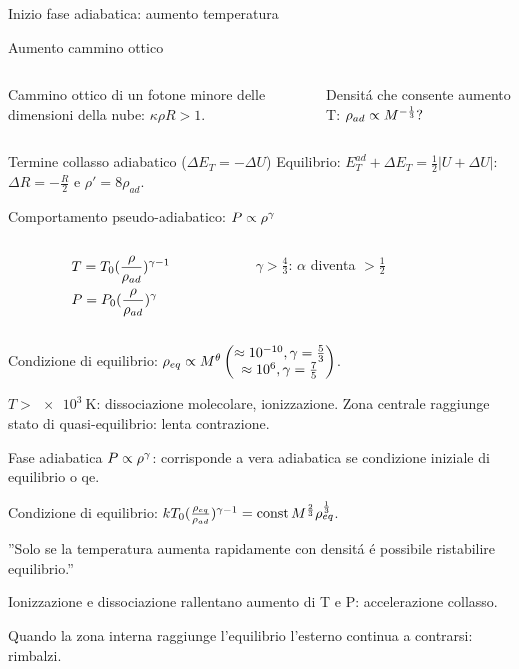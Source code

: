 \begin{frame}{Inizio fase adiabatica: aumento temperatura}
\begin{block}{Aumento cammino ottico}
\begin{columns}[T]
\begin{column}{0.5\textwidth}
Cammino ottico di un fotone minore delle dimensioni della nube: $\kappa\rho R>1$.
\end{column}
\begin{column}{0.5\textwidth}
Densit\'a che consente aumento T: $\rho_{ad}\propto M^{-\frac{1}{3}}?$
\end{column}
\end{columns}
\end{block}
\begin{block}{Termine collasso adiabatico ($\Delta E_T=-\Delta U$)}
Equilibrio: $E_T^{ad}+\Delta E_T=\frac{1}{2}|U+\Delta U|$: $\Delta R=-\frac{R}{2}$ e $\rho'=8\rho_{ad}$.
\end{block}
\begin{block}{Comportamento pseudo-adiabatico: $P\propto\rho^{\gamma}$}
\begin{columns}[T]
\begin{column}{0.5\textwidth}
\begin{align*}
&T=T_0(\frac{\rho}{\rho_{ad}})^{\gamma-1}\\
&P=P_0(\frac{\rho}{\rho_{ad}})^{\gamma}
\end{align*}
\end{column}
\begin{column}{0.5\textwidth}
$\gamma>\frac{4}{3}$: $\alpha$ diventa $>\frac{1}{2}$
\end{column}
\end{columns}
Condizione di equilibrio: $\rho_{eq}\propto M^{\theta}\begin{pmatrix}
\approx\num{e-10}, \gamma=\frac{5}{3}\\
\approx\num{e6}, \gamma=\frac{7}{5}
\end{pmatrix}$.
\end{block}
$T>\SI{e3}{\kelvin}$: dissociazione molecolare, ionizzazione.
Zona centrale raggiunge stato di quasi-equilibrio: lenta contrazione.
\end{frame}

\begin{wordonframe}{Fase adiabatica}
$P\propto\rho^{\gamma}$: corrisponde a vera adiabatica  se condizione iniziale di equilibrio o qe.

Condizione di equilibrio: $kT_0(\frac{\rho_{eq}}{\rho_{ad}})^{\gamma-1}=\operatorname{const} M^{\frac{2}{3}}\rho_{eq}^{\frac{1}{3}}$.

''Solo se la temperatura aumenta rapidamente con densit\'a \'e possibile ristabilire equilibrio.''

Ionizzazione e dissociazione rallentano aumento di T e P: accelerazione collasso.

Quando la zona interna raggiunge l'equilibrio l'esterno continua a contrarsi: rimbalzi.

\end{wordonframe}